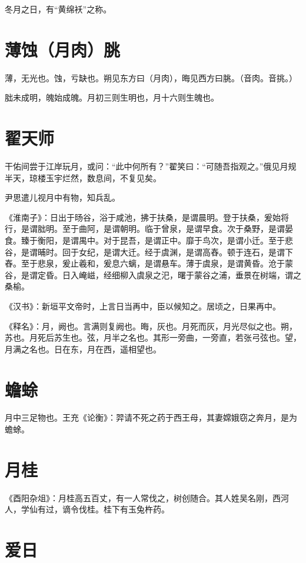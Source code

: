 \documentclass[a4paper,12pt,UTF8,twoside]{ctexbook}
\begin{document}
冬月之日，有“黄绵袄”之称。

	\section{薄蚀（月肉）脁}

薄，无光也。蚀，亏缺也。朔见东方曰（月肉），晦见西方曰脁。（音肉。音挑。）

胐未成明，魄始成魄。月初三则生明也，月十六则生魄也。

	\section{翟天师}

干佑间尝于江岸玩月，或问：“此中何所有？”翟笑曰：“可随吾指观之。”俄见月规半天，琼楼玉宇烂然，数息间，不复见矣。

尹思遣儿视月中有物，知兵乱。

《淮南子》：日出于旸谷，浴于咸池，拂于扶桑，是谓晨明。登于扶桑，爰始将行，是谓胐明。至于曲阿，是谓朝明。临于曾泉，是谓早食。次于桑野，是谓晏食。臻于衡阳，是谓禺中。对于昆吾，是谓正中。靡于鸟次，是谓小迁。至于悲谷，是谓晡时。回于女纪，是谓大迁。经于虞渊，是谓高舂。顿于连石，是谓下舂。至于悲泉，爰止羲和，爰息六螭，是谓悬车。薄于虞泉，是谓黄昏。沧于蒙谷，是谓定昏。日入崦嵫，经细柳入虞泉之汜，曙于蒙谷之浦，垂景在树端，谓之桑榆。

《汉书》：新垣平文帝时，上言日当再中，臣以候知之。居顷之，日果再中。

《释名》：月，阙也。言满则复阙也。晦，灰也。月死而灰，月光尽似之也。朔，苏也。月死后苏生也。弦，月半之名也。其形一旁曲，一旁直，若张弓弦也。望，月满之名也。日在东，月在西，遥相望也。

	\section{蟾蜍}

月中三足物也。王充《论衡》：羿请不死之药于西王母，其妻嫦娥窃之奔月，是为蟾蜍。

	\section{月桂}

《酉阳杂俎》：月桂高五百丈，有一人常伐之，树创随合。其人姓吴名刚，西河人，学仙有过，谪令伐桂。桂下有玉兔杵药。

	\section{爱日}
\end{document}
